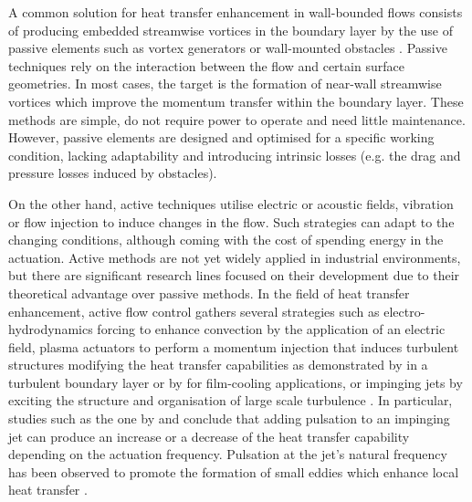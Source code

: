 A common solution for heat transfer enhancement in wall-bounded flows consists of producing embedded streamwise vortices in the boundary layer \citep{jacobi1995} by the use of passive elements such as vortex generators \citep{Ke2019VG} or wall-mounted obstacles \citep{nakamura2001cube, mallor2018cubes}.
Passive techniques rely on the interaction between the flow and certain surface geometries. In most cases, the target is the formation of near-wall streamwise vortices which improve the momentum transfer within the boundary layer. These methods are simple, do not require power to operate and need little maintenance. However, passive elements are designed and optimised for a specific working condition, lacking adaptability and introducing intrinsic losses (e.g. the drag and pressure losses induced by obstacles).

On the other hand, active techniques utilise electric or acoustic fields, vibration or flow injection to induce changes in the flow. Such strategies can adapt to the changing conditions, although coming with the cost of spending energy in the actuation. Active methods are not yet widely applied in industrial environments, but there are significant research lines focused on their development due to their theoretical advantage over passive methods.
In the field of heat transfer enhancement, active flow control gathers several strategies such as electro-hydrodynamics forcing \citep[see e.g.][]{ElectroHydroALLEN1995389} to enhance convection by the application of an electric field, plasma actuators to perform a momentum injection that induces turbulent structures modifying the heat transfer capabilities as demonstrated by \citet{castellanos2022plasma} in a turbulent boundary layer or by \citet{roy2008plasma} for film-cooling applications, or impinging jets by exciting the structure and organisation of large scale turbulence \citep{Kataoka1987ij}.
In particular, studies such as the one by \citet{MLADIN19973305} and \citet{LIU19963695} conclude that adding pulsation to an impinging jet can produce an increase or a decrease of the heat transfer capability depending on the actuation frequency. Pulsation at the jet's natural frequency has been observed to promote the formation of small eddies which enhance local heat transfer \citep{LIU19963695}.


